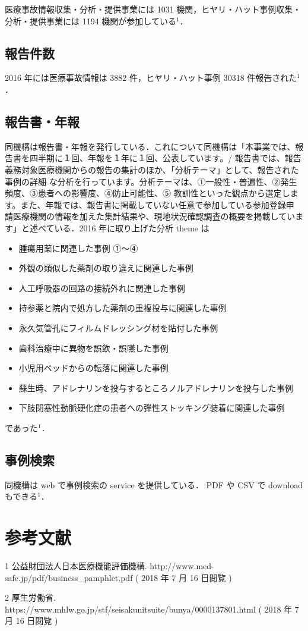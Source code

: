 \documentclass[11pt,dvipdfmx,uplatex]{jsarticle}
\begin{document}
医療事故情報収集・分析・提供事業には 1031 機関，ヒヤリ・ハット事例収集・分析・提供事業には 1194 機関が参加している$^1$．

\subsection{報告件数}

2016 年には医療事故情報は 3882 件，ヒヤリ・ハット事例 30318 件報告された$^1$．

\subsection{報告書・年報}

同機構は報告書・年報を発行している．これについて同機構は「本事業では、報告書を四半期に１回、年報を１年に１回、公表しています。/ 報告書では、報告義務対象医療機関からの報告の集計のほか、「分析テーマ」として、報告された事例の詳細
な分析を行っています。分析テーマは、①一般性・普遍性、②発生頻度、③患者への影響度、④防止可能性、⑤
教訓性といった観点から選定します。また、年報では、報告書に掲載していない任意で参加している参加登録申
請医療機関の情報を加えた集計結果や、現地状況確認調査の概要を掲載しています」と述べている．2016 年に取り上げた分析 theme は

\begin{itemize}
\item 腫瘍用薬に関連した事例 ①～④

\item 外観の類似した薬剤の取り違えに関連した事例

\item 人工呼吸器の回路の接続外れに関連した事例

\item 持参薬と院内で処方した薬剤の重複投与に関連した事例

\item 永久気管孔にフィルムドレッシング材を貼付した事例

\item 歯科治療中に異物を誤飲・誤嚥した事例

\item 小児用ベッドからの転落に関連した事例

\item 蘇生時、アドレナリンを投与するところノルアドレナリンを投与した事例

\item 下肢閉塞性動脈硬化症の患者への弾性ストッキング装着に関連した事例
	
\end{itemize}

であった$^1$．

\subsection{事例検索}

同機構は web で事例検索の service を提供している． PDF や CSV で download もできる$^1$．

\section{参考文献}

1 公益財団法人日本医療機能評価機構. http://www.med-safe.jp/pdf/business_pamphlet.pdf ( 2018 年 7 月 16 日閲覧 )

2 厚生労働省. https://www.mhlw.go.jp/stf/seisakunitsuite/bunya/0000137801.html ( 2018 年 7 月 16 日閲覧 )
\end{document}
